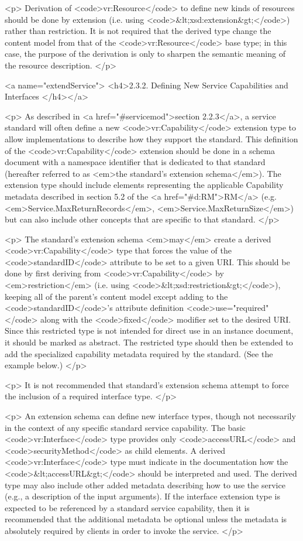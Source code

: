 \documentclass[11pt,a4paper]{ivoa}
\begin{document}
<p>
Derivation of <code>vr:Resource</code> to define new kinds of
resources should be done by extension (i.e. using 
<code>&lt;xsd:extension&gt;</code>) rather than restriction.  It is
not required that the derived type change the content model from that
of the <code>vr:Resource</code> base type; in this case, the purpose
of the derivation is only to sharpen the semantic meaning of the
resource description.  
</p>

<a name="extendService">
<h4>2.3.2.  Defining New Service Capabilities and Interfaces </h4></a>

<p>
As described in <a href="#servicemod">section 2.2.3</a>, a service
standard will often define a new <code>vr:Capability</code> extension
type to allow implementations to describe how they support the
standard.  This definition of the <code>vr:Capability</code> extension
should be done in a schema document with a namespace identifier that
is dedicated to that standard (hereafter referred to as <em>the
standard's extension schema</em>).  The extension type should include
elements representing the applicable Capability metadata described in
section 5.2 of the <a href="#d:RM">RM</a>
(e.g. <em>Service.MaxReturnRecords</em>, <em>Service.MaxReturnSize</em>)
but can also include other concepts that are specific to that standard.
</p>

<p>
The standard's extension schema <em>may</em> create a derived
<code>vr:Capability</code> type that forces the value of the
<code>standardID</code> attribute to be set to a given URI.  This
should be done by first deriving from <code>vr:Capability</code> by
<em>restriction</em> (i.e. using
<code>&lt;xsd:restriction&gt;</code>), keeping all of the parent's
content model except adding to the <code>standardID</code>'s attribute
definition <code>use="required"</code> along with the
<code>fixed</code> modifier set to the desired URI.  Since this
restricted type is not intended for direct use in an instance
document, it should be marked as abstract.  The restricted type should
then be extended to add the specialized capability metadata required
by the standard.  (See the example below.)  
</p>

<p>
It is not recommended that standard's extension schema attempt to
force the inclusion of a required interface type.  
</p>

<p>
An extension schema can define new interface types, though not
necessarily in the context of any specific standard service
capability.  The basic <code>vr:Interface</code> type provides only
<code>accessURL</code> and <code>securityMethod</code> as child
elements.  A derived <code>vr:Interface</code> type must indicate in
the documentation how the <code>&lt;accessURL&gt;</code> should be
interpreted and used.  The derived type may also include other added
metadata describing how to use the service (e.g., a description of the
input arguments).  If the interface extension type is expected to be
referenced by a standard service capability, then it is recommended
that the additional metadata be optional unless the metadata is
absolutely required by clients in order to invoke the service.
</p>
\end{document}
